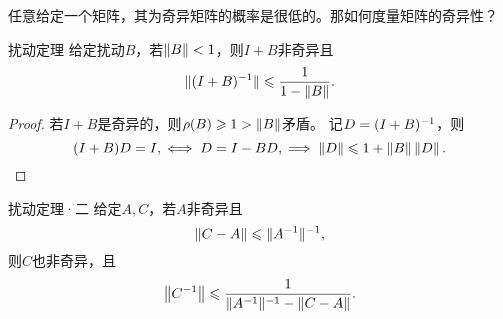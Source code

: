 任意给定一个矩阵，其为奇异矩阵的概率是很低的。那如何度量矩阵的奇异性？%

\begin{theorem}
    {扰动定理}{}
    给定扰动$B$，若$\left\lVert B\right\rVert<1$，则$I+B$非奇异且
    \begin{equation}
        \lVert(I+B)^{-1}\rVert\leqslant\frac1{1-\left\lVert B\right\rVert}.
    \end{equation}
\end{theorem}

\begin{proof}
    若$I+B$是奇异的，则$\rho(B)\geqslant 1>\left\lVert B\right\rVert$矛盾。
    记$D=(I+B)^{-1}$，则 
    \[
        (I+B)D=I,\iff D=I-BD,\implies \left\lVert D\right\rVert\leqslant 1+\left\lVert B\right\rVert\left\lVert D\right\rVert.
        \qedhere
    \]
\end{proof}

\begin{theorem}
    {扰动定理·二}{}
    给定$A,C$，若$A$非奇异且
    \[
        \left\lVert C-A\right\rVert\leqslant\lVert A^{-1}\rVert^{-1},
    \]
    则$C$也非奇异，且
    \begin{equation}
        \left\lVert C^{-1}\right\rVert\leqslant\frac{1}{\lVert A^{-1}\rVert^{-1}-\left\lVert C-A\right\rVert}.
    \end{equation}
\end{theorem}



